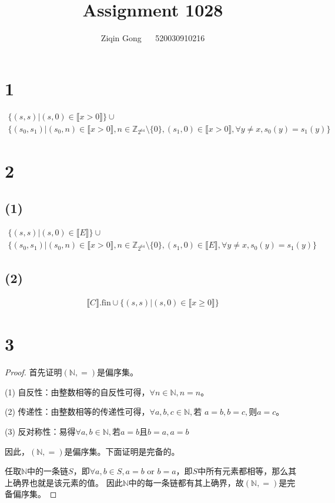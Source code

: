 \documentclass[12pt]{article}
\title{Assignment 1028}
\author{Ziqin Gong $\quad$ 520030910216}
\date{}
\newcommand{\zz}{\mathbb{Z}_{2^{64}}}
\begin{document}
  \maketitle

  \section*{1}

    \begin{gather*}
      \{(s,s) | (s,0) \in \llbracket x>0 \rrbracket\} \cup \\
      \{(s_0,s_1) | (s_0,n) \in \llbracket x>0 \rrbracket, n\in\zz\setminus\{0\},(s_1,0) \in \llbracket x>0 \rrbracket, \forall y\neq x,s_0(y)=s_1(y)\}
    \end{gather*}

  \section*{2}

  \subsection*{(1)}

    \begin{gather*}
      \{(s,s) | (s,0) \in \llbracket E \rrbracket\} \cup \\
      \{(s_0,s_1) | (s_0,n) \in \llbracket x>0 \rrbracket, n\in\zz\setminus\{0\}, (s_1,0)\in\llbracket E \rrbracket, \forall y\neq x,s_0(y)=s_1(y)\}
    \end{gather*}

  \subsection*{(2)}

    \begin{gather*}
      \llbracket C \rrbracket.\textrm{fin} \cup \{(s,s) | (s,0)\in\llbracket x\geq0 \rrbracket\}
    \end{gather*}

  \section*{3}

    \begin{proof}
      首先证明$(\mathbb{N},=)$是偏序集。

      (1) 自反性：由整数相等的自反性可得，$\forall n \in \mathbb{N}, n=n$。

      (2) 传递性：由整数相等的传递性可得，$\forall a,b,c \in \mathbb{N}, \textrm{若 }a=b,b=c, \textrm{则}a=c$。

      (3) 反对称性：易得$\forall a,b \in \mathbb{N}, \textrm{若} a=b \textrm{且} b=a, a=b$

      因此，$(\mathbb{N},=)$是偏序集。下面证明是完备的。

      任取$\mathbb{N}$中的一条链$S$，即$\forall a,b \in S, a=b \textrm{ or } b=a$，即$S$中所有元素都相等，那么其上确界也就是该元素的值。
      因此$\mathbb{N}$中的每一条链都有其上确界，故$(\mathbb{N},=)$是完备偏序集。
    \end{proof}
\end{document}
